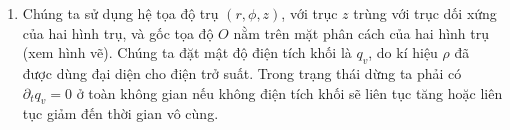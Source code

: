  \begin{loigiai}\[\]
\begin{enumerate}
  \item Chúng ta sử dụng hệ tọa độ trụ $(r,\phi,z)$, với trục $z$ trùng với trục dối xứng của hai hình trụ, và gốc tọa độ $O$ nằm trên mặt phân cách của hai hình trụ (xem hình vẽ). Chúng ta đặt mật độ điện tích khối là $q_v$, do kí hiệu $\rho$ đã được dùng đại diện cho điện trở suất. Trong trạng thái dừng ta phải có $\partial_t q_v =0$ ở toàn không gian nếu không điện tích khối sẽ liên tục tăng hoặc liên tục giảm đến thời gian vô cùng.
  
\end{enumerate}
\end{loigiai}
